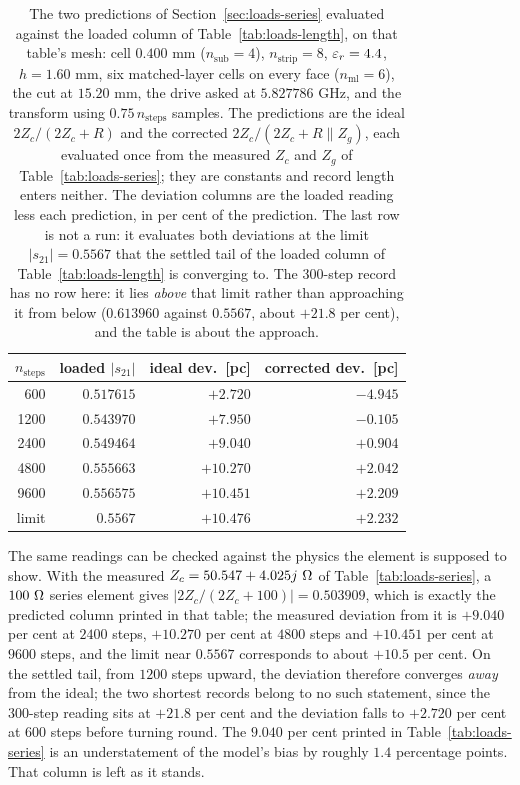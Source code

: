 \begin{table}[H]
  \centering
  \caption{The two predictions of Section~\ref{sec:loads-series} evaluated against the loaded column of
  Table~\ref{tab:loads-length}, on that table's mesh: cell $0.400$ mm ($n_{\mathrm{sub}} = 4$),
  $n_{\mathrm{strip}} = 8$, $\varepsilon_r = 4.4$, $h = 1.60$ mm, six matched-layer cells on every face
  ($n_{\mathrm{ml}} = 6$), the cut at $15.20$ mm, the drive asked at $5.827786$ GHz, and the transform using
  $0.75\,n_{\mathrm{steps}}$ samples. The predictions are the ideal $2Z_c/(2Z_c + R)$ and the corrected
  $2Z_c/(2Z_c + R \parallel Z_g)$, each evaluated once from the measured $Z_c$ and $Z_g$ of
  Table~\ref{tab:loads-series}; they are constants and record length enters neither. The deviation columns are
  the loaded reading less each prediction, in per cent of the prediction. The last row is not a run: it evaluates
  both deviations at the limit $|s_{21}| = 0.5567$ that the settled tail of the loaded column of
  Table~\ref{tab:loads-length} is converging to. The $300$-step record has no row here: it lies \emph{above}
  that limit rather than approaching it from below ($0.613960$ against $0.5567$, about $+21.8$ per cent), and the
  table is about the approach.}
  \label{tab:loads-limit}
  \small
  \begin{tabular}{@{}rrrr@{}}
    \toprule
    $n_{\mathrm{steps}}$ & loaded $|s_{21}|$ & ideal dev.\ [pc] & corrected dev.\ [pc] \\
    \midrule
      600 & $0.517615$ & $+2.720$ & $-4.945$ \\
     1200 & $0.543970$ & $+7.950$ & $-0.105$ \\
     2400 & $0.549464$ & $+9.040$ & $+0.904$ \\
     4800 & $0.555663$ & $+10.270$ & $+2.042$ \\
     9600 & $0.556575$ & $+10.451$ & $+2.209$ \\
    limit & $0.5567$ & $+10.476$ & $+2.232$ \\
    \bottomrule
  \end{tabular}
\end{table}

The same readings can be checked against the physics the element is supposed to show. With the measured
$Z_c = 50.547 + 4.025j\ \Omega$ of Table~\ref{tab:loads-series}, a $100\ \Omega$ series element gives
$|2Z_c/(2Z_c + 100)| = 0.503909$, which is exactly the predicted column printed in that table; the measured
deviation from it is $+9.040$ per cent at $2400$ steps, $+10.270$ per cent at $4800$ steps and $+10.451$ per cent
at $9600$ steps, and the limit near $0.5567$ corresponds to about $+10.5$ per cent. On the settled tail, from
$1200$ steps upward, the deviation therefore converges \emph{away} from the ideal; the two shortest records
belong to no such statement, since the $300$-step reading sits at $+21.8$ per cent and the deviation falls to
$+2.720$ per cent at $600$ steps before turning round. The $9.040$ per cent printed in Table~\ref{tab:loads-series}
is an
understatement of the model's bias by roughly $1.4$ percentage points. That column is left as it stands.

